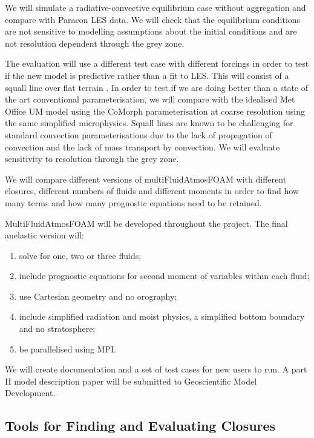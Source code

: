 \documentclass[11pt,a4paper]{article}
\begin{document}
We will simulate a radiative-convective equilibrium case without aggregation and compare with Paracon LES data. We will check that the equilibrium conditions are not sensitive to modelling assumptions about the initial conditions and are not resolution dependent through the grey zone.



The evaluation will use a different test case with different forcings in order to test if the new model is predictive rather than a fit to LES. This will consist of a squall line over flat terrain \cite[]{FM06}. In order to test if we are doing better than a state of the art conventional parameterisation, we will compare with the idealised Met Office UM model using the CoMorph parameterisation at coarse resolution using the same simplified microphysics. Squall lines are known to be challenging for standard convection parameterisations \cite[e.g.][]{LCD+08} due to the lack of propagation of convection and the lack of mass transport by convection. We will evaluate sensitivity to resolution through the grey zone. 

We will compare different versions of multiFluidAtmosFOAM with different closures, different numbers of fluids and different moments in order to find how many terms and how many prognostic equations need to be retained. 


MultiFluidAtmosFOAM will be developed throughout the project. The final anelastic version will:
\begin{enumerate}
\item solve for one, two or three fluids;
\item include prognostic equations for second moment of variables within each fluid;
\item use Cartesian geometry and no orography;
\item include simplified radiation and moist physics, a simplified bottom boundary and no stratosphere;
\item be parallelised using MPI.
\end{enumerate}
We will create documentation and a set of test cases for new users to run. A part II model description paper will be submitted to Geoscientific Model Development.

\subsection{Tools for Finding and Evaluating Closures}
\label{sec:tools}
\end{document}
